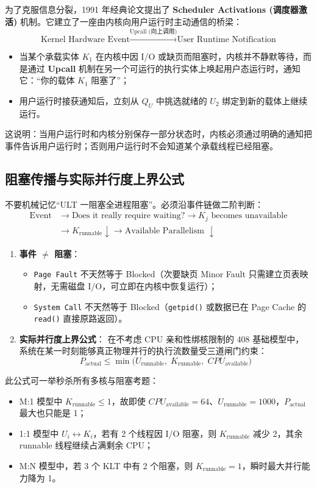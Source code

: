 \documentclass[11pt,a4paper]{ctexart}
\newcommand{\kw}[1]{\textbf{#1}}
\newcommand{\code}[1]{\texttt{#1}}
\begin{document}
为了克服信息分裂，1991 年经典论文提出了 \kw{Scheduler Activations (调度器激活)} 机制。它建立了一座由内核向用户运行时主动通信的桥梁：
\[
\boxed{\text{Kernel Hardware Event} \xrightarrow{\text{Upcall (向上调用)}} \text{User Runtime Notification}}
\]
\begin{itemize}
\item 当某个承载实体 $K_1$ 在内核中因 I/O 或缺页而阻塞时，内核并不静默等待，而是通过 \kw{Upcall} 机制在另一个可运行的执行实体上唤起用户态运行时，通知它：“你的载体 $K_1$ 阻塞了”；
\item 用户运行时接获通知后，立刻从 $Q_U$ 中挑选就绪的 $U_2$ 绑定到新的载体上继续运行。
\end{itemize}
这说明：当用户运行时和内核分别保存一部分状态时，内核必须通过明确的通知把事件告诉用户运行时；否则用户运行时不会知道某个承载线程已经阻塞。

\subsection{阻塞传播与实际并行度上界公式}

不要机械记忆“ULT 一阻塞全进程阻塞”。必须沿事件链做二阶判断：
\[
\boxed{
\begin{aligned}
\text{Event}
&\longrightarrow
\text{Does it really require waiting?}
\longrightarrow
K_j \text{ becomes unavailable}\\
&\longrightarrow
K_{\text{runnable}} \downarrow
\longrightarrow
\text{Available Parallelism } \downarrow
\end{aligned}
}
\]

\begin{enumerate}
\item \kw{事件 $\neq$ 阻塞}：
  \begin{itemize}
    \item \code{Page Fault} 不天然等于 Blocked（次要缺页 Minor Fault 只需建立页表映射，无需磁盘 I/O，可立即在内核中恢复运行）；
    \item \code{System Call} 不天然等于 Blocked（\code{getpid()} 或数据已在 Page Cache 的 \code{read()} 直接原路返回）。
  \end{itemize}
\item \kw{实际并行度上界公式}：
  在不考虑 CPU 亲和性绑核限制的 408 基础模型中，系统在某一时刻能够真正物理并行的执行流数量受三道闸门约束：
  \[
  \boxed{
  P_{\text{actual}} \le \min\Big( U_{\text{runnable}}, \; K_{\text{runnable}}, \; CPU_{\text{available}} \Big)
  }
  \]
\end{enumerate}

此公式可一举秒杀所有多核与阻塞考题：
\begin{itemize}
\item M:1 模型中 $K_{\text{runnable}} \le 1$，故即使 $CPU_{\text{available}} = 64$、$U_{\text{runnable}} = 1000$，$P_{\text{actual}}$ 最大也只能是 1；
\item 1:1 模型中 $U_i \leftrightarrow K_i$，若有 2 个线程因 I/O 阻塞，则 $K_{\text{runnable}}$ 减少 2，其余 runnable 线程继续占满剩余 CPU；
\item M:N 模型中，若 3 个 KLT 中有 2 个阻塞，则 $K_{\text{runnable}} = 1$，瞬时最大并行能力降为 1。
\end{itemize}
\end{document}
